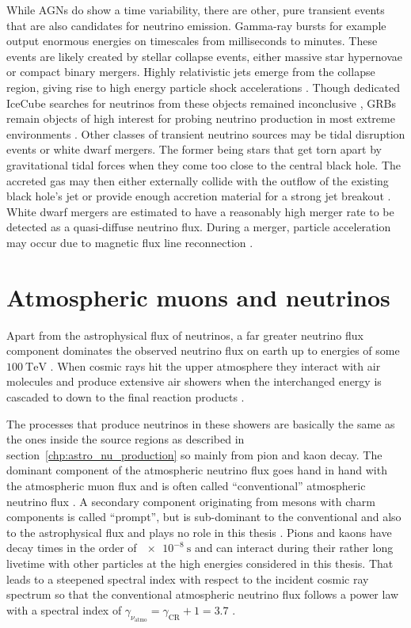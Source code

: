While AGNs do show a time variability, there are other, pure transient events that are also candidates for neutrino emission.
Gamma-ray bursts for example output enormous energies on timescales from milliseconds to minutes.
These events are likely created by stellar collapse events, either massive star hypernovae or compact binary mergers.
Highly relativistic jets emerge from the collapse region, giving rise to high energy particle shock accelerations \cite{Bianco:2007fe}.
Though dedicated IceCube searches for neutrinos from these objects remained inconclusive \cite{Aartsen:2016qcr,Abbasi:2010grb}, GRBs remain objects of high interest for probing neutrino production in most extreme environments \cite{Senno:2016grb}.
Other classes of transient neutrino sources may be tidal disruption events or white dwarf mergers.
The former being stars that get torn apart by gravitational tidal forces when they come too close to the central black hole.
The accreted gas may then either externally collide with the outflow of the existing black hole's jet or provide enough accretion material for a strong jet breakout \cite{Mattila:2018gsg}.
White dwarf mergers are estimated to have a reasonably high merger rate to be detected as a quasi-diffuse neutrino flux.
During a merger, particle acceleration may occur due to magnetic flux line reconnection \cite{Xiao:2016man}.


\section{Atmospheric muons and neutrinos}
Apart from the astrophysical flux of neutrinos, a far greater neutrino flux component dominates the observed neutrino flux on earth up to energies of some $\SI{100}{\TeV}$ \cite{Engberg:2008prompt,Gaisser:2002jj}.
When cosmic rays hit the upper atmosphere they interact with air molecules and produce extensive air showers when the interchanged energy is cascaded to down to the final reaction products \cite{Gaisser:2016uoy}.

The processes that produce neutrinos in these showers are basically the same as the ones inside the source regions as described in section~\ref{chp:astro_nu_production} so mainly from pion and kaon decay.
The dominant component of the atmospheric neutrino flux goes hand in hand with the atmospheric muon flux and is often called \enquote{conventional} atmospheric neutrino flux \cite{Gaisser:2002jj,Gondolo:1995fq}.
A secondary component originating from mesons with charm components is called \enquote{prompt}, but is sub-dominant to the conventional and also to the astrophysical flux and plays no role in this thesis \cite{Engberg:2008prompt,Haack:2017dxi}.
Pions and kaons have decay times in the order of $\SI{e-8}{\s}$ \cite{Patrignani:2016xqp} and can interact during their rather long livetime with other particles at the high energies considered in this thesis.
That leads to a steepened spectral index with respect to the incident cosmic ray spectrum so that the conventional atmospheric neutrino flux follows a power law with a spectral index of $\gamma_{\nu_\text{atmo}} = \gamma_\text{CR} + 1 = 3.7$ \cite{Gondolo:1995fq}.
